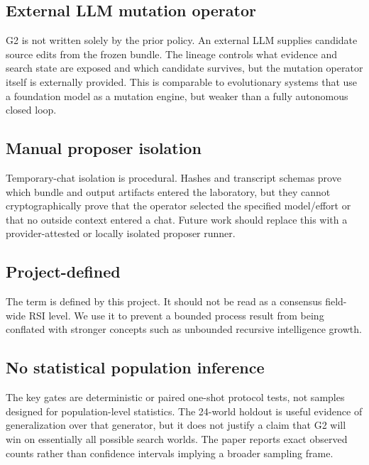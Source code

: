 \subsection{External LLM mutation operator}

G2 is not written solely by the prior policy. An external LLM supplies candidate source edits from the frozen bundle. The lineage controls what evidence and search state are exposed and which candidate survives, but the mutation operator itself is externally provided. This is comparable to evolutionary systems that use a foundation model as a mutation engine, but weaker than a fully autonomous closed loop.

\subsection{Manual proposer isolation}

Temporary-chat isolation is procedural. Hashes and transcript schemas prove which bundle and output artifacts entered the laboratory, but they cannot cryptographically prove that the operator selected the specified model/effort or that no outside context entered a chat. Future work should replace this with a provider-attested or locally isolated proposer runner.

\subsection{Project-defined \lthreep}

The term \lthreep is defined by this project. It should not be read as a consensus field-wide RSI level. We use it to prevent a bounded process result from being conflated with stronger concepts such as unbounded recursive intelligence growth.

\subsection{No statistical population inference}

The key gates are deterministic or paired one-shot protocol tests, not samples designed for population-level statistics. The 24-world holdout is useful evidence of generalization over that generator, but it does not justify a claim that G2 will win on essentially all possible search worlds. The paper reports exact observed counts rather than confidence intervals implying a broader sampling frame.
